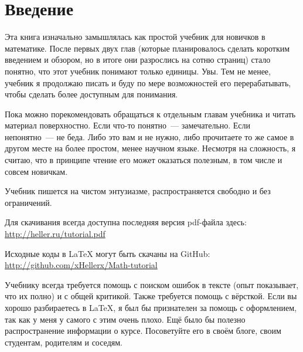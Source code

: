 \chapter*{Введение}

Эта книга изначально замышлялась как простой учебник для новичков в математике. После первых двух глав (которые планировалось сделать коротким введением и обзором, но в итоге они разрослись на сотню страниц) стало понятно, что этот учебник понимают только единицы. Увы. Тем не менее, учебник я продолжаю писать и буду по мере возможностей его перерабатывать, чтобы сделать более доступным для понимания.

Пока можно порекомендовать обращаться к отдельным главам учебника и читать материал поверхностно. Если что-то понятно~— замечательно. Если непонятно~— не беда. Либо это вам и не нужно, либо прочитаете то же самое в другом месте на более простом, менее научном языке. Несмотря на сложность, я считаю, что в принципе чтение его может оказаться полезным, в том числе и совсем новичкам.

Учебник пишется на чистом энтузиазме, распространяется свободно и без ограничений.

Для скачивания всегда доступна последняя версия pdf-файла здесь: \url{http://heller.ru/tutorial.pdf}

Исходные коды в \LaTeX{} могут быть скачаны на GitHub: \linebreak
\url{http://github.com/xHellerx/Math-tutorial}

Учебнику всегда требуется помощь с поиском ошибок в тексте (опыт показывает, что их полно) и с общей критикой. Также требуется помощь с вёрсткой. Если вы хорошо разбираетесь в \LaTeX, я был бы признателен за помощь с оформлением, так как у меня у самого с этим очень плохо. Ещё было бы полезно распространение информации о курсе. Посоветуйте его в своём блоге, своим студентам, родителям и соседям.
